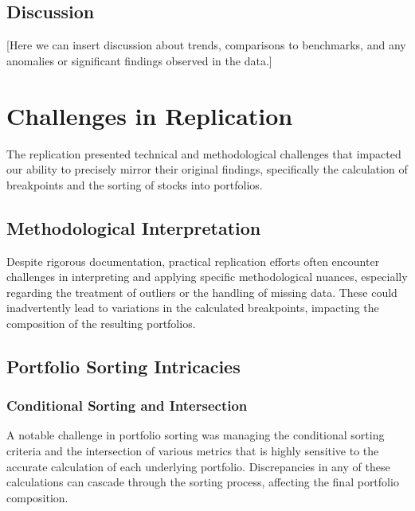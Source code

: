 \documentclass{article}
\begin{document}



\subsection*{Discussion}

[Here we can insert discussion about trends, comparisons to benchmarks, and any anomalies or significant findings observed in the data.]


\section*{Challenges in Replication}

The replication presented technical and methodological challenges that impacted our ability to precisely mirror their original findings, specifically the calculation of breakpoints and the sorting of stocks into portfolios.

\subsection*{Methodological Interpretation}

Despite rigorous documentation, practical replication efforts often encounter challenges in interpreting and applying specific methodological nuances, especially regarding the treatment of outliers or the handling of missing data. These could inadvertently lead to variations in the calculated breakpoints, impacting the composition of the resulting portfolios.

\subsection*{Portfolio Sorting Intricacies}

\subsubsection*{Conditional Sorting and Intersection}

A notable challenge in portfolio sorting was managing the conditional sorting criteria and the intersection of various metrics that is highly sensitive to the accurate calculation of each underlying portfolio. Discrepancies in any of these calculations can cascade through the sorting process, affecting the final portfolio composition.
\end{document}
